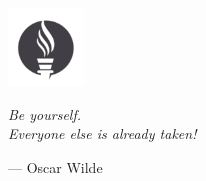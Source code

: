 
\vspace*{\fill}

\begin{adjustwidth}{8cm}{}

    \begin{center}
        \includegraphics[width=2cm]{Figuras/placeholder_epigraph.png}
    \end{center}

    \noindent\textit{
        Be yourself. \\
        Everyone else is already taken!
    }
    \begin{flushright}
        — Oscar Wilde
    \end{flushright}
\end{adjustwidth}

\newpage